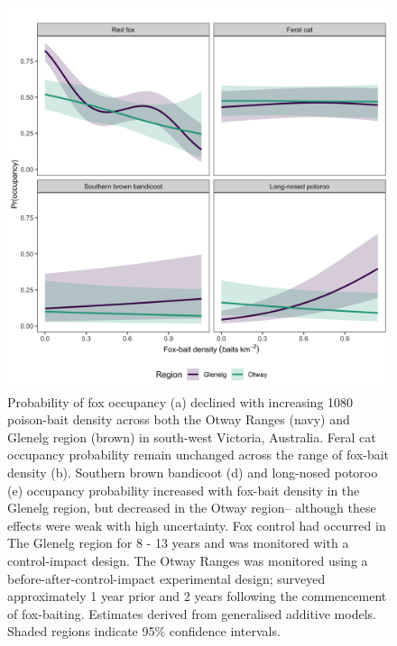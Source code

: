 \documentclass[11pt,a4paper,titlepage,twoside,openright]{style/unimelbthesis}
\begin{document}
\begin{mainmatter}
\begin{figure}
{\centering \includegraphics[width=1\linewidth]{figure/foxbaits} 

}

\caption{Probability of fox occupancy (a) declined with increasing 1080 poison-bait density across both the Otway Ranges (navy) and Glenelg region (brown) in south-west Victoria, Australia. Feral cat occupancy probability remain unchanged across the range of fox-bait density (b). Southern brown bandicoot (d) and long-nosed potoroo (e) occupancy probability increased with fox-bait density in the Glenelg region, but decreased in the Otway region– although these effects were weak with high uncertainty. Fox control had occurred in The Glenelg region for 8 - 13 years and was monitored with a control-impact design. The Otway Ranges was monitored using a before-after-control-impact experimental design; surveyed approximately 1 year prior and 2 years following the commencement of fox-baiting. Estimates derived from generalised additive models. Shaded regions indicate 95\% confidence intervals.}\label{fig:occ-1080}
\end{figure}
\newpage
\begin{figure}


\end{figure}
\end{mainmatter}
\end{document}
